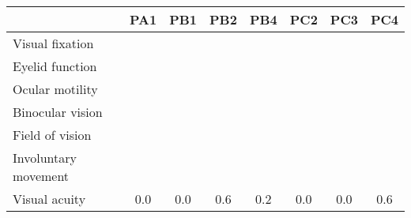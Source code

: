 \begin{tabular}{@{}lccccccc@{}}
	\toprule
	                     & PA1      & PB1      & PB2       & PB4      & PC2       & PC3       & PC4       \\
	\midrule
	Visual fixation      & \noskill & \noskill & \noskill  & \noskill & \noskill  & \noskill  & \noskill  \\
	Eyelid function      & \skill   & \skill   & \skill    & \skill   & \skill    & \noskill  & \noskill  \\
	Ocular motility      & \skill   & \noskill & \skill    & \noskill & \snoskill & \snoskill & \noskill  \\
	Binocular vision     & \skill   & \skill   & \skill    & \skill   & \noskill  & \snoskill & \snoskill \\
	Field of vision      & \skill   & \skill   & \skill    & \skill   & \skill    & \snoskill & \noskill  \\
	Involuntary movement & \skill   & \noskill & \snoskill & \noskill & \noskill  & \noskill  & \skill    \\
	\midrule
	Visual acuity        & 0.0      & 0.0      & 0.6       & 0.2      & 0.0       & 0.0       & 0.6       \\
	\bottomrule
\end{tabular}
